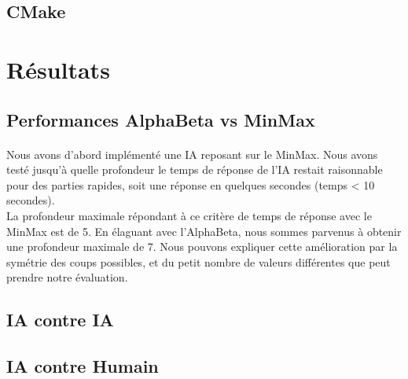 \documentclass[article, backcover, french, nodocumentinfo]{upmethodology-document}
\begin{document}
		\subsection{CMake}
	\section{Résultats}
		\subsection{Performances AlphaBeta vs MinMax}
			\paragraph{}
				Nous avons d'abord implémenté une IA reposant sur le MinMax. Nous avons testé jusqu'à quelle profondeur le temps de réponse de l'IA restait raisonnable pour des parties rapides, soit une réponse en quelques secondes (temps < 10 secondes).\\
				La profondeur maximale répondant à ce critère de temps de réponse avec le MinMax est de 5. En élaguant avec l'AlphaBeta, nous sommes parvenus à obtenir une profondeur maximale de 7. Nous pouvons expliquer cette amélioration par la symétrie des coups possibles, et du petit nombre de valeurs différentes que peut prendre notre évaluation.
		\subsection{IA contre IA}
		\subsection{IA contre Humain}
\end{document}
